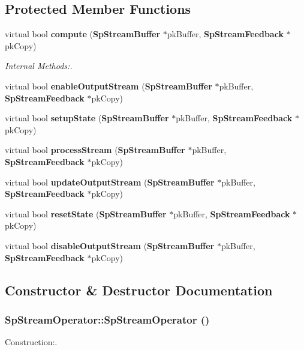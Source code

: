\subsection*{Protected Member Functions}
\begin{CompactItemize}
\item 
virtual bool {\bf compute} ({\bf Sp\-Stream\-Buffer} $\ast$pk\-Buffer, {\bf Sp\-Stream\-Feedback} $\ast$pk\-Copy)
\begin{CompactList}\small\item\em Internal Methods:. \item\end{CompactList}\item 
virtual bool {\bf enable\-Output\-Stream} ({\bf Sp\-Stream\-Buffer} $\ast$pk\-Buffer, {\bf Sp\-Stream\-Feedback} $\ast$pk\-Copy)
\item 
virtual bool {\bf setup\-State} ({\bf Sp\-Stream\-Buffer} $\ast$pk\-Buffer, {\bf Sp\-Stream\-Feedback} $\ast$pk\-Copy)
\item 
virtual bool {\bf process\-Stream} ({\bf Sp\-Stream\-Buffer} $\ast$pk\-Buffer, {\bf Sp\-Stream\-Feedback} $\ast$pk\-Copy)
\item 
virtual bool {\bf update\-Output\-Stream} ({\bf Sp\-Stream\-Buffer} $\ast$pk\-Buffer, {\bf Sp\-Stream\-Feedback} $\ast$pk\-Copy)
\item 
virtual bool {\bf reset\-State} ({\bf Sp\-Stream\-Buffer} $\ast$pk\-Buffer, {\bf Sp\-Stream\-Feedback} $\ast$pk\-Copy)
\item 
virtual bool {\bf disable\-Output\-Stream} ({\bf Sp\-Stream\-Buffer} $\ast$pk\-Buffer, {\bf Sp\-Stream\-Feedback} $\ast$pk\-Copy)
\end{CompactItemize}


\subsection{Constructor \& Destructor Documentation}
\subsubsection{\setlength{\rightskip}{0pt plus 5cm}Sp\-Stream\-Operator::Sp\-Stream\-Operator ()}\label{classSpark_1_1SpStreamOperator_a0}


Construction:. 

